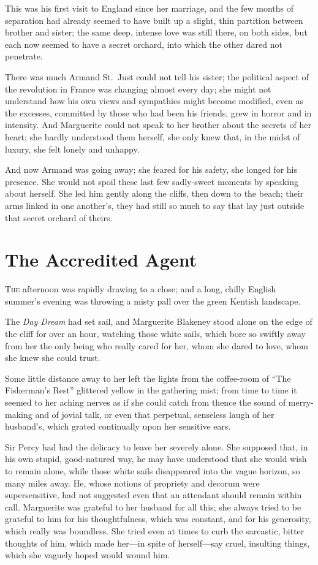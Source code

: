 \documentclass[paper=5.5in:8.5in,BCOR=7mm,twoside,DIV=calc,12pt,usegeometry,chapterprefix,endperiod,headings=big]{scrbook}
\begin{document}
This was his first visit to England since her marriage, and the few months of separation had already seemed to have built up a slight, thin partition between brother and sister; the same deep, intense love was still there, on both sides, but each now seemed to have a secret orchard, into which the other dared not penetrate.

There was much Armand St.~Just could not tell his sister; the political aspect of the revolution in France was changing almost every day; she might not understand how his own views and sympathies might become modified, even as the excesses, committed by those who had been his friends, grew in horror and in intensity. And Marguerite could not speak to her brother about the secrets of her heart; she hardly understood them herself, she only knew that, in the midst of luxury, she felt lonely and unhappy.

And now Armand was going away; she feared for his safety, she longed for his presence. She would not spoil these last few sadly-sweet moments by speaking about herself. She led him gently along the cliffs, then down to the beach; their arms linked in one another's, they had still so much to say that lay just outside that secret orchard of theirs.

\chapter{The Accredited Agent}
\lettrine[lines=4]{T}{he} afternoon was rapidly drawing to a close; and a long, chilly English summer's evening was throwing a misty pall over the green Kentish landscape.

The \textit{\textit{Day Dream}} had set sail, and Marguerite Blakeney stood alone on the edge of the cliff for over an hour, watching those white sails, which bore so swiftly away from her the only being who really cared for her, whom she dared to love, whom she knew she could trust.

Some little distance away to her left the lights from the coffee-room of \enquote{The Fisherman's Rest} glittered yellow in the gathering mist; from time to time it seemed to her aching nerves as if she could catch from thence the sound of merry-making and of jovial talk, or even that perpetual, senseless laugh of her husband's, which grated continually upon her sensitive ears.

Sir Percy had had the delicacy to leave her severely alone. She supposed that, in his own stupid, good-natured way, he may have understood that she would wish to remain alone, while those white sails disappeared into the vague horizon, so many miles away. He, whose notions of propriety and decorum were supersensitive, had not suggested even that an attendant should remain within call. Marguerite was grateful to her husband for all this; she always tried to be grateful to him for his thoughtfulness, which was constant, and for his generosity, which really was boundless. She tried even at times to curb the sarcastic, bitter thoughts of him, which made her---in spite of herself---say cruel, insulting things, which she vaguely hoped would wound him.
\end{document}
